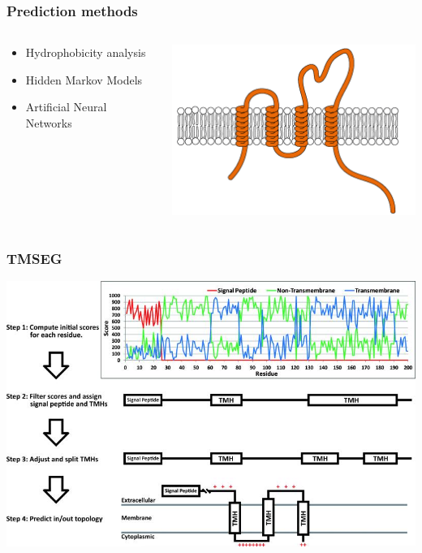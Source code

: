 \documentclass{beamer}
\begin{document}
\begin{frame}
\frametitle{Prediction methods}
\begin{columns}
	\begin{column}{0.5\textwidth}
		\begin{itemize}
			\item Hydrophobicity analysis
			\item Hidden Markov Models
			\item Artificial Neural Networks
		\end{itemize}
	\end{column}
	\begin{column}{0.5\textwidth}
		\begin{center}
			\includegraphics[width=\textwidth]{tmp.png}
		\end{center}
	\end{column}
\end{columns}
\end{frame}

\begin{frame}
\frametitle{TMSEG}
\centering
\includegraphics[width=\textwidth]{tmseg.jpg}
\end{frame}
\end{document}

